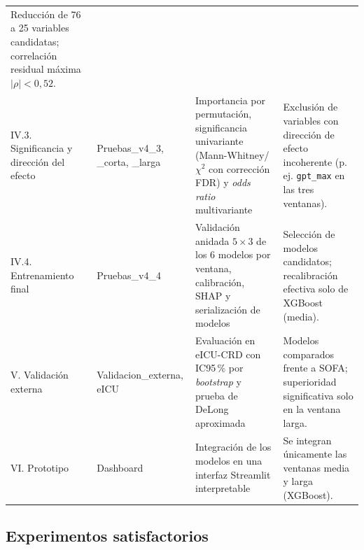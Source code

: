 \documentclass[
  spanish,
  a4paper,
  12pt,
  twoside]{memoir}
\newcommand{\ruta}[1]{{\sffamily #1}}
\begin{document}
\begin{table}[htbp]
{\begin{tabular}{p{2.0cm} p{3.4cm} p{4.6cm} p{4.6cm}}
    Reducción de 76 a 25 variables candidatas; correlación residual máxima $|\rho|<0{,}52$. \\
    \addlinespace
    IV.3. Significancia y dirección del efecto &
    \ruta{Pruebas\_v4\_3}, \ruta{\_corta}, \ruta{\_larga} &
    Importancia por permutación, significancia univariante (Mann-Whitney/$\chi^2$ con corrección FDR) y \emph{odds ratio} multivariante &
    Exclusión de variables con dirección de efecto incoherente (p.\,ej. \texttt{gpt\_max} en las tres ventanas). \\
    \addlinespace
    IV.4. Entrenamiento final &
    \ruta{Pruebas\_v4\_4} &
    Validación anidada $5\times3$ de los 6 modelos por ventana, calibración, SHAP y serialización de modelos &
    Selección de modelos candidatos; recalibración efectiva solo de XGBoost (media). \\
    \addlinespace
    V. Validación externa &
    \ruta{Validacion\_externa}, \ruta{eICU} &
    Evaluación en eICU-CRD con IC95\,\% por \textit{bootstrap} y prueba de DeLong aproximada &
    Modelos comparados frente a SOFA; superioridad significativa solo en la ventana larga. \\
    \addlinespace
    VI. Prototipo &
    \ruta{Dashboard} &
    Integración de los modelos en una interfaz Streamlit interpretable &
    Se integran únicamente las ventanas media y larga (XGBoost). \\
    \bottomrule
  \end{tabular}%
  }
\end{table}

\subsection*{Experimentos satisfactorios}
\end{document}
